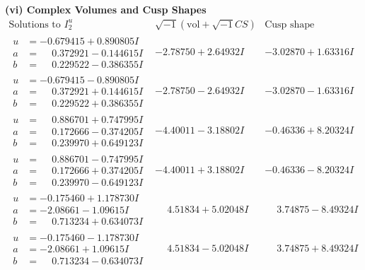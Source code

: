 \documentclass[1p]{elsarticle_modified}
\theoremstyle{definition}
\newcommand{\I}{\sqrt{-1}}
\begin{document}
\newpage\flushleft \textbf{(vi) Complex Volumes and Cusp Shapes}
$$\begin{array}{c|c|c}  
\text{Solutions to }I^u_{2}& \I (\text{vol} + \sqrt{-1}CS) & \text{Cusp shape}\\
 \hline 
\begin{aligned}
u &= -0.679415 + 0.890805 I \\
a &= \phantom{-}0.372921 - 0.144615 I \\
b &= \phantom{-}0.229522 - 0.386355 I\end{aligned}
 & -2.78750 + 2.64932 I & -3.02870 + 1.63316 I \\ \hline\begin{aligned}
u &= -0.679415 - 0.890805 I \\
a &= \phantom{-}0.372921 + 0.144615 I \\
b &= \phantom{-}0.229522 + 0.386355 I\end{aligned}
 & -2.78750 - 2.64932 I & -3.02870 - 1.63316 I \\ \hline\begin{aligned}
u &= \phantom{-}0.886701 + 0.747995 I \\
a &= \phantom{-}0.172666 - 0.374205 I \\
b &= \phantom{-}0.239970 + 0.649123 I\end{aligned}
 & -4.40011 - 3.18802 I & -0.46336 + 8.20324 I \\ \hline\begin{aligned}
u &= \phantom{-}0.886701 - 0.747995 I \\
a &= \phantom{-}0.172666 + 0.374205 I \\
b &= \phantom{-}0.239970 - 0.649123 I\end{aligned}
 & -4.40011 + 3.18802 I & -0.46336 - 8.20324 I \\ \hline\begin{aligned}
u &= -0.175460 + 1.178730 I \\
a &= -2.08661 - 1.09615 I \\
b &= \phantom{-}0.713234 + 0.634073 I\end{aligned}
 & \phantom{-}4.51834 + 5.02048 I & \phantom{-}3.74875 - 8.49324 I \\ \hline\begin{aligned}
u &= -0.175460 - 1.178730 I \\
a &= -2.08661 + 1.09615 I \\
b &= \phantom{-}0.713234 - 0.634073 I\end{aligned}
 & \phantom{-}4.51834 - 5.02048 I & \phantom{-}3.74875 + 8.49324 I \\ \hline\begin{aligned}

\end{aligned}
\end{array}$$
\end{document}
